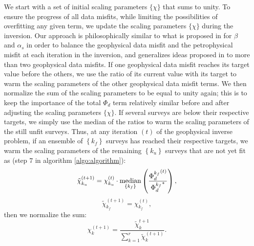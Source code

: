 \documentclass[extra, mreferee]{gji_joint} %
\begin{document}

We start with a set of initial scaling parameters $\{\chi\}$ that sums to unity. To ensure the progress of all data misfits, while limiting the possibilities of overfitting any given term, we update the scaling parameters $\{\chi\}$ during the inversion. Our approach is philosophically similar to what is proposed in \citet{ggz389} for $\beta$ and $\alpha_s$ in order to balance the geophysical data misfit and the petrophysical misfit at each iteration in the inversion, and generalizes ideas proposed in \citet{Lelievre2012} to more than two geophysical data misfits. If one geophysical data misfit reaches its target value before the others, we use the ratio of its current value with its target to warm the scaling parameters of the other geophysical data misfit terms. We then normalize the sum of the scaling parameters to be equal to unity again; this is to keep the importance of the total $\Phi_d$ term relatively similar before and after adjusting the scaling parameters $\{\chi\}$. If several surveys are below their respective targets, we simply use the median of the ratios to warm the scaling parameters of the still unfit surveys. Thus, at any iteration $(t)$ of the geophysical inverse problem, if an ensemble of $\left\{k_f\right\}$ surveys has reached their respective targets, we warm the scaling parameters of the remaining $\left\{k_u\right\}$ surveys that are not yet fit as (step $7$ in algorithm \ref{algo:algorithm}):
\begin{equation}
\tilde{\chi}_{k_u}^{(t+1)} = \chi_{k_u}^{(t)} \cdot \mathop{\hbox{median}}\limits_{\left\{k_f\right\}} \left(\frac{{\Phi_d^{k_f}}^{(t)}}{{\Phi_d^{k_f}}^*}\right) \label{eq:chi_update},
\end{equation}
\begin{equation}
\tilde{\chi}_{k_f}^{(t+1)} = {\chi}_{k_f}^{(t)},
\end{equation}
then we normalize the sum:
\begin{equation}
{\chi^{(t+1)}_k} = \frac{\tilde{\chi}_k^{t+1}}{\sum_{k=1}^r \tilde{\chi}_{k}^{(t+1)}} \label{eq:chi_normalizing}.
\end{equation}
\end{document}
